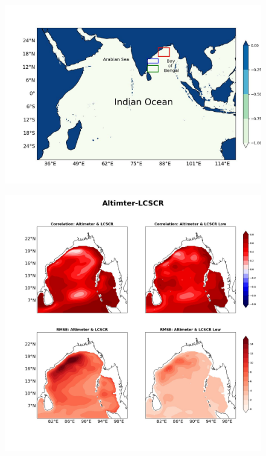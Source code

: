 \documentclass[review]{elsarticle}
\begin{document}

\begin{figure}[!h]
	\begin{center}
		\includegraphics[width=1\textwidth]{./images/domain_fig.jpg}
		\caption {
		}
		\label{fig:paper_01}
	\end{center}
\end{figure}

\begin{figure}[!h]
	\begin{center}
		\includegraphics[width=1\textwidth]{./images/corr_plot_altimter.jpg}
		\caption {
		}
		\label{fig:paper_02}
	\end{center}
\end{figure}
\clearpage
\end{document}
